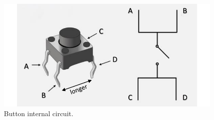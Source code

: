 \documentclass[a4paper,11pt]{article}
\begin{document}
    \begin{figure}[h] %
        \centering
        \includegraphics[width=1\textwidth]{fig4.pdf} %
        \caption{Button internal circuit.}
        \label{fig:button1}
    \end{figure}
\end{document}
